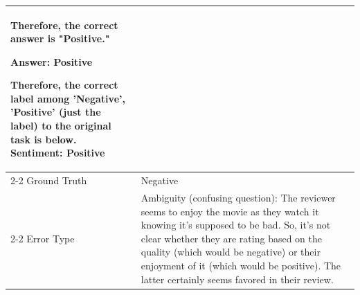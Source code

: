 \begin{longtable} {p{3cm}p{13.85cm}}
Therefore, the correct answer is "Positive."

Answer: Positive

Therefore, the correct label among {'Negative', 'Positive'} (just the label) to the original task is below.
Sentiment: Positive \\ \cline{2-2}
Ground Truth & Negative \\ \cline{2-2}
Error Type & Ambiguity (confusing question): The reviewer seems to enjoy the movie as they watch it knowing it's supposed to be bad. So, it's not clear whether they are rating based on the quality (which would be negative) or their enjoyment of it (which would be positive). The latter certainly seems favored in their review.\\ 
\bottomrule

\end{longtable}
\endgroup